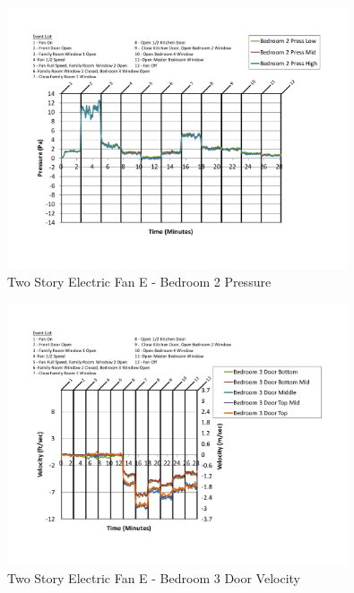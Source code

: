 \documentclass{article}
\begin{document}
\begin{appendices}
	\begin{figure}[H]
		\centering
		\includegraphics[height=3.05in,trim=0.67in 1.1in 0.67in 0.8in,clip=true]{0_Images/Results_Charts/ColdFlow/Two_Story/Electric/E/Bedroom_2_Pressure.pdf}
		\caption{Two Story Electric Fan E - Bedroom 2 Pressure}
	\end{figure}
 

	\begin{figure}[H]
		\centering
		\includegraphics[height=3.05in,trim=0.67in 1.1in 0.67in 0.8in,clip=true]{0_Images/Results_Charts/ColdFlow/Two_Story/Electric/E/Bedroom_3_Door_Velocity.pdf}
		\caption{Two Story Electric Fan E - Bedroom 3 Door Velocity}
	\end{figure}
 
	\clearpage


\end{appendices}
\end{document}
